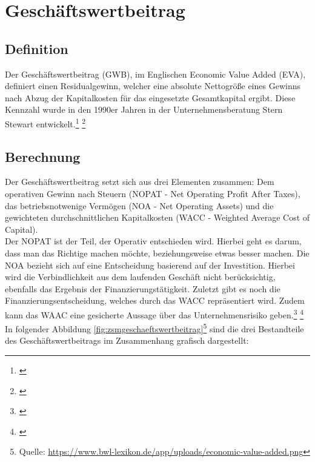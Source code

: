 \chapter{Geschäftswertbeitrag}
\label{Geschaeftswertbeitrag}

\section{Definition}

Der Geschäftswertbeitrag (GWB), im Englischen Economic Value Added (EVA), definiert einen Residualgewinn, welcher eine absolute Nettogröße eines Gewinns nach Abzug der Kapitalkosten für das eingesetzte Gesamtkapital ergibt. Diese Kennzahl wurde in den 1990er Jahren in der Unternehmensberatung Stern Stewart entwickelt.\footnote{\cite{wikipedia-eva}} \footnote{\cite{controlling-eva}}

\section{Berechnung}

Der Geschäftswertbeitrag setzt sich aus drei Elementen zusammen: Dem operativen Gewinn nach Steuern (NOPAT - Net Operating Profit After Taxes), das betriebsnotwenige Vermögen (NOA - Net Operating Assets) und die gewichteten durchschnittlichen Kapitalkosten (WACC - Weighted Average Cost of Capital).\\
Der NOPAT ist der Teil, der Operativ entschieden wird. Hierbei geht es darum, dass man das Richtige machen möchte, beziehungsweise etwas besser machen. Die NOA bezieht sich auf eine Entscheidung basierend auf der Investition. Hierbei wird die Verbindlichkeit aus dem laufenden Geschäft nicht berücksichtig, ebenfalls das Ergebnis der Finanzierungstätigkeit. Zuletzt gibt es noch die Finanzierungsentscheidung, welches durch das WACC repräsentiert wird. Zudem kann das WAAC eine gesicherte Aussage über das Unternehmensrisiko geben.\footnote{\cite{bwllexicon-eva}} \footnote{\cite{wikipedia-eva}}\\
In folgender Abbildung \ref{fig:zsmgeschaeftswertbeitrag}\footnote{Quelle: \url{https://www.bwl-lexikon.de/app/uploads/economic-value-added.png}} sind die drei Bestandteile des Geschäftswertbeitrags im Zusammenhang grafisch dargestellt:

